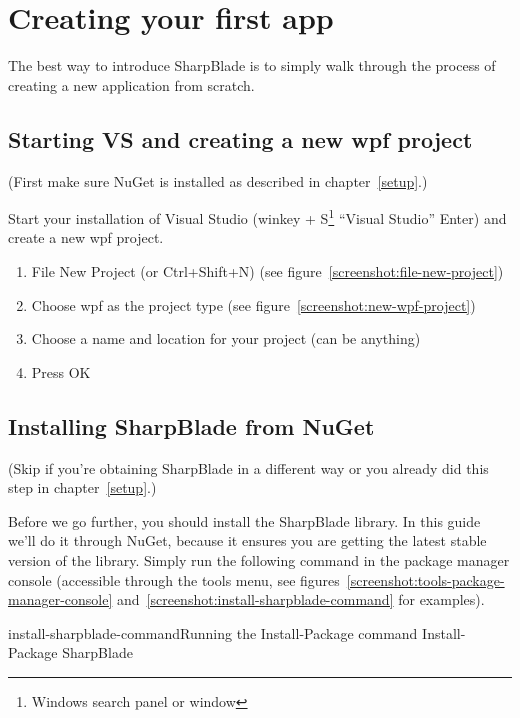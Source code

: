 \chapter{Creating your first app}
The best way to introduce SharpBlade is to simply walk through the process of creating a new application from scratch.

\section{Starting VS and creating a new \acrshort{wpf} project}
(First make sure NuGet is installed as described in chapter~\ref{setup}.)

Start your installation of Visual Studio (\gls{winkey} + S\footnote{Windows search panel or window} \rarr ``Visual Studio'' \rarr Enter) and create a new \gls{wpf} project.

\begin{enumerate}
    \item File \rarr New \rarr Project (or Ctrl+Shift+N) (see figure~\ref{screenshot:file-new-project})
    \item Choose \gls{wpf} as the project type (see figure~\ref{screenshot:new-wpf-project})
    \item Choose a name and location for your project (can be anything)
    \item Press OK
\end{enumerate}


\section{Installing SharpBlade from NuGet}
(Skip if you're obtaining SharpBlade in a different way or you already did this step in chapter~\ref{setup}.)

Before we go further, you should install the SharpBlade library. In this guide we'll do it through NuGet, because it ensures you are getting the latest stable version of the library. Simply run the following command in the package manager console (accessible through the tools menu, see figures~\ref{screenshot:tools-package-manager-console} and~\ref{screenshot:install-sharpblade-command} for examples).

\begin{cexample}{install-sharpblade-command}{Running the Install-Package command}
    Install-Package SharpBlade
\end{cexample}

